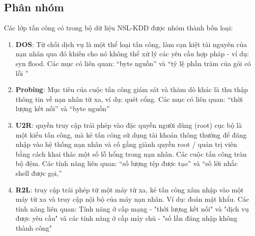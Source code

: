 \subsection{Phân nhóm}
Các lớp tấn công có trong bộ dữ liệu NSL-KDD được nhóm thành bốn loại:
\begin{enumerate}
	\item \textbf{DOS}: Từ chối dịch vụ là một thể loại tấn công, làm cạn kiệt tài nguyên của nạn nhân qua đó khiến cho nó không thể xử lý các yêu cầu hợp pháp - ví dụ: syn flood.
	      Các mục có liên quan: “byte nguồn” và “tỷ lệ phần trăm của gói có lỗi ”
	\item \textbf{Probing}: Mục tiêu của cuộc tấn công giám sát và thăm dò khác là thu thập thông tin về nạn nhân từ xa, ví dụ: quét cổng.
	      Các mục có liên quan: “thời lượng kết nối” và “byte nguồn”
	\item \textbf{U2R}: quyền truy cập trái phép vào đặc quyền người dùng (root) cục bộ là một kiểu tấn công, mà kẻ tấn công sử dụng tài khoản thông thường để đăng nhập vào hệ thống nạn nhân và cố gắng giành quyền root / quản trị viên bằng cách khai thác một số lỗ hổng trong nạn nhân.
	      Các cuộc tấn công tràn bộ đệm. Các tính năng liên quan: “số lượng tệp được tạo” và “số lời nhắc shell được gọi,”
	\item \textbf{R2L}: truy cập trái phép từ một máy từ xa, kẻ tấn công xâm nhập vào một máy từ xa và truy cập nội bộ của máy nạn nhân.
	      Ví dụ: đoán mật khẩu. Các tính năng liên quan: Tính năng ở cấp mạng - "thời lượng kết nối" và "dịch vụ được yêu cầu" và các tính năng ở cấp máy chủ - "số lần đăng nhập không thành công"
\end{enumerate}